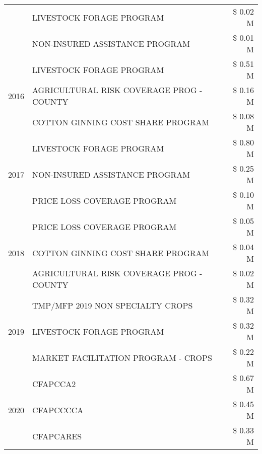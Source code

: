 \begin{tabular}{llr}
 & LIVESTOCK FORAGE PROGRAM & \$ 0.02 M \\
 & NON-INSURED ASSISTANCE PROGRAM & \$ 0.01 M \\
\cline{1-3}
\multirow[t]{3}{*}{2016} & LIVESTOCK FORAGE PROGRAM                      & \$ 0.51 M \\
 & AGRICULTURAL RISK COVERAGE PROG - COUNTY      & \$ 0.16 M \\
 & COTTON GINNING COST SHARE PROGRAM             & \$ 0.08 M \\
\cline{1-3}
\multirow[t]{3}{*}{2017} & LIVESTOCK FORAGE PROGRAM & \$ 0.80 M \\
 & NON-INSURED ASSISTANCE PROGRAM & \$ 0.25 M \\
 & PRICE LOSS COVERAGE PROGRAM & \$ 0.10 M \\
\cline{1-3}
\multirow[t]{3}{*}{2018} & PRICE LOSS COVERAGE PROGRAM & \$ 0.05 M \\
 & COTTON GINNING COST SHARE PROGRAM & \$ 0.04 M \\
 & AGRICULTURAL RISK COVERAGE PROG - COUNTY & \$ 0.02 M \\
\cline{1-3}
\multirow[t]{3}{*}{2019} & TMP/MFP 2019 NON SPECIALTY CROPS & \$ 0.32 M \\
 & LIVESTOCK FORAGE PROGRAM & \$ 0.32 M \\
 & MARKET FACILITATION PROGRAM - CROPS & \$ 0.22 M \\
\cline{1-3}
\multirow[t]{3}{*}{2020} & CFAPCCA2 & \$ 0.67 M \\
 & CFAPCCCCA & \$ 0.45 M \\
 & CFAPCARES & \$ 0.33 M \\
\cline{1-3}
\bottomrule
\end{tabular}
